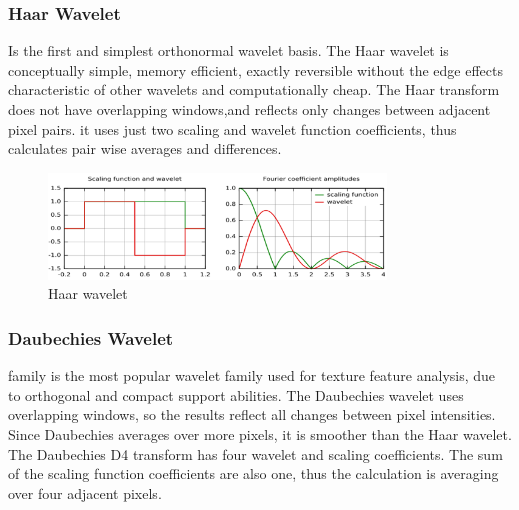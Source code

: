 \documentclass[12pt, a4paper, twoside]{report}
\begin{document}
\subsubsection{Haar Wavelet}
Is the first and simplest orthonormal wavelet basis. The Haar wavelet is conceptually simple, memory efficient, exactly reversible without the edge effects characteristic of other wavelets and computationally cheap. The Haar transform does not have overlapping windows,and reflects only changes between adjacent pixel pairs. it uses just two scaling and wavelet function coefficients, thus calculates pair wise averages and differences.
\begin{figure}[!h]
	\centering
	\includegraphics[width=0.8\textwidth]
	{images/chapter3/haar-wavelet}
	\caption{Haar wavelet}
	\label{fig:haar-wavelet}
\end{figure}

\subsubsection{Daubechies Wavelet}
family is the most popular wavelet family used for texture feature analysis, due to orthogonal and compact support abilities. The Daubechies wavelet uses overlapping windows, so the results reflect all changes between pixel intensities. Since Daubechies averages over more pixels, it is smoother than the Haar wavelet. The Daubechies D4 transform has four wavelet and scaling coefficients. The sum of the scaling function coefficients are also one, thus the calculation is averaging over four adjacent pixels.
\end{document}
